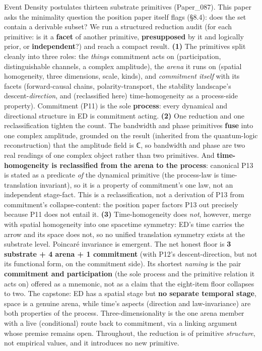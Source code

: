 \documentclass[
  11pt,
]{article}
\begin{document}
Event Density postulates thirteen substrate primitives (Paper\_087).
This paper asks the minimality question the position paper itself flags
(§8.4): does the set contain a derivable subset? We run a structured
reduction audit (for each primitive: is it a \textbf{facet} of another
primitive, \textbf{presupposed} by it and logically prior, or
\textbf{independent}?) and reach a compact result. \textbf{(1)} The
primitives split cleanly into three roles: the \emph{things} commitment
acts on (participation, distinguishable channels, a complex amplitude),
the \emph{arena} it runs on (spatial homogeneity, three dimensions,
scale, kinds), and \emph{commitment itself} with its facets
(forward-causal chains, polarity-transport, the stability landscape's
descent-\emph{direction}, and (reclassified here) time-homogeneity as a
process-side property). Commitment (P11) is the sole \textbf{process}:
every dynamical and directional structure in ED is commitment acting.
\textbf{(2)} One reduction and one reclassification tighten the count.
The bandwidth and phase primitives \textbf{fuse} into one complex
amplitude, grounded on the result (inherited from the quantum-logic
reconstruction) that the amplitude field is ℂ, so bandwidth and phase
are two real readings of one complex object rather than two primitives.
And \textbf{time-homogeneity is reclassified from the arena to the
process}: canonical P13 is stated as a predicate \emph{of} the dynamical
primitive (the process-law is time-translation invariant), so it is a
property of commitment's one law, not an independent stage-fact. This is
a reclassification, not a derivation of P13 from commitment's
collapse-content: the position paper factors P13 out precisely because
P11 does not entail it. \textbf{(3)} Time-homogeneity does \emph{not},
however, merge with spatial homogeneity into one spacetime symmetry:
ED's time carries the arrow and its space does not, so no unified
translation symmetry exists at the substrate level. Poincaré invariance
is emergent. The net honest floor is \textbf{3 substrate + 4 arena + 1
commitment} (with P12's descent-direction, but not its functional form,
on the commitment side). Its shortest \emph{naming} is the pair
\textbf{commitment and participation} (the sole process and the
primitive relation it acts on) offered as a mnemonic, not as a claim
that the eight-item floor collapses to two. The capstone: ED has a
spatial stage but \textbf{no separate temporal stage}, space is a
genuine arena, while time's aspects (direction and law-invariance) are
both properties of the process. Three-dimensionality is the one arena
member with a live (conditional) route back to commitment, via a linking
argument whose premise remains open. Throughout, the reduction is of
primitive \emph{structure}, not empirical values, and it introduces no
new primitive.
\end{document}
